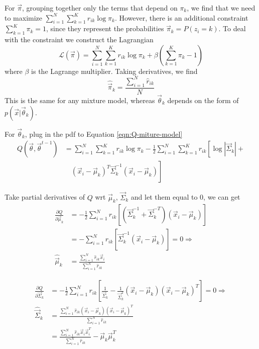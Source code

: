 For $\vec{\pi}$, grouping together only the terms that depend on $\pi_k$, we find that we need to maximize $\sum\limits_{i=1}^N{\sum\limits_{k=1}^K{r_{ik}\log \pi_k}}$. However, there is an additional constraint $\sum\limits_{k=1}^K{\pi_k}=1$, since they represent the probabilities $\vec{\pi}_k=P(z_i=k)$. To deal with the constraint we construct the Lagrangian
\begin{equation}
\mathcal{L}(\vec{\pi})=\sum\limits_{i=1}^N{\sum\limits_{k=1}^K{r_{ik}\log \pi_k}}+\beta\left(\sum\limits_{k=1}^K{\pi_k}-1\right) \nonumber
\end{equation}
where $\beta$ is the Lagrange multiplier. Taking derivatives, we find
\begin{equation}
\hat{\vec{\pi}}_k=\frac{\sum\limits_{i=1}^N \hat{r}_{ik}}{N}
\end{equation}
This is the same for any mixture model, whereas $\vec{\theta}_k$ depends on the form of $p(\vec{x}|\vec{\theta}_k)$.

For $\vec{\theta}_k$, plug in the pdf to Equation \eqref{eqn:Q-miture-model}
\begin{equation*}\begin{split}
Q(\vec{\theta}, \vec{\theta}^{t-1}) & =\sum\limits_{i=1}^N{\sum\limits_{k=1}^K{r_{ik}\log \pi_k}}-\frac{1}{2}\sum\limits_{i=1}^N  \sum\limits_{k=1}^K  r_{ik}\left[\log |\vec{\Sigma}_k| + \right. \\
 & \quad \left. (\vec{x}_i-\vec{\mu}_k)^T\vec{\Sigma}_k^{-1}(\vec{x}_i-\vec{\mu}_k)\right]
\end{split}\end{equation*}

Take partial derivatives of $Q$ wrt $\vec{\mu}_k$, $\vec{\Sigma}_k$ and let them equal to 0, we can get
\begin{align}
\frac{\partial Q}{\partial \vec{\mu}_k} & = -\frac{1}{2}\sum\limits_{i=1}^N{r_{ik}\left[(\vec{\Sigma}_k^{-1}+\vec{\Sigma}_k^{-T})(\vec{x}_i-\vec{\mu}_k)\right]} \nonumber \\
    &  =-\sum\limits_{i=1}^N{r_{ik}\left[\vec{\Sigma}_k^{-1}(\vec{x}_i-\vec{\mu}_k)\right]}=0 \Rightarrow \nonumber \\
\hat{\vec{\mu}}_k & = \frac{\sum_{i=1}^N \hat{r}_{ik}\vec{x}_i}{\sum_{i=1}^N \hat{r}_{ik}}
\end{align}

\begin{align}
\frac{\partial Q}{\partial \vec{\Sigma}_k} & = -\frac{1}{2}\sum\limits_{i=1}^N{r_{ik}\left[\frac{1}{\vec{\Sigma}_k}-\frac{1}{\vec{\Sigma}_k^2}(\vec{x}_i-\vec{\mu}_k)(\vec{x}_i-\vec{\mu}_k)^T\right]}=0 \Rightarrow \nonumber \\
\hat{\vec{\Sigma}}_k & = \frac{\sum_{i=1}^N \hat{r}_{ik}(\vec{x}_i-\vec{\mu}_k)(\vec{x}_i-\vec{\mu}_k)^T}{\sum_{i=1}^N \hat{r}_{ik}} \\
 & =\frac{\sum_{i=1}^N \hat{r}_{ik}\vec{x}_i\vec{x}_i^T}{\sum_{i=1}^N \hat{r}_{ik}}-\vec{\mu}_k\vec{\mu}_k^T
\end{align}



